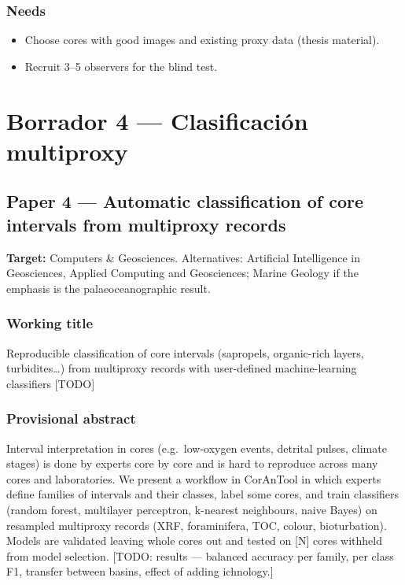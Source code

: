 \documentclass[
  10pt,
]{article}
\providecommand{\tightlist}{%
  \setlength{\itemsep}{0pt}\setlength{\parskip}{0pt}}
\begin{document}
\hypertarget{needs-1}{%
\subsubsection{Needs}\label{needs-1}}

\begin{itemize}
\tightlist
\item[$\square$]
  Choose cores with good images and existing proxy data (thesis
  material).
\item[$\square$]
  Recruit 3--5 observers for the blind test.
\end{itemize}

\newpage

\hypertarget{borrador-4-clasificaciuxf3n-multiproxy}{%
\section{Borrador 4 --- Clasificación
multiproxy}\label{borrador-4-clasificaciuxf3n-multiproxy}}

\hypertarget{paper-4-automatic-classification-of-core-intervals-from-multiproxy-records}{%
\subsection{Paper 4 --- Automatic classification of core intervals from
multiproxy
records}\label{paper-4-automatic-classification-of-core-intervals-from-multiproxy-records}}

\textbf{Target:} Computers \& Geosciences. Alternatives: Artificial
Intelligence in Geosciences, Applied Computing and Geosciences; Marine
Geology if the emphasis is the palaeoceanographic result.

\hypertarget{working-title-2}{%
\subsubsection{Working title}\label{working-title-2}}

Reproducible classification of core intervals (sapropels, organic-rich
layers, turbidites\ldots) from multiproxy records with user-defined
machine-learning classifiers {[}TODO{]}

\hypertarget{provisional-abstract-1}{%
\subsubsection{Provisional abstract}\label{provisional-abstract-1}}

Interval interpretation in cores (e.g.~low-oxygen events, detrital
pulses, climate stages) is done by experts core by core and is hard to
reproduce across many cores and laboratories. We present a workflow in
CorAnTool in which experts define families of intervals and their
classes, label some cores, and train classifiers (random forest,
multilayer perceptron, k-nearest neighbours, naive Bayes) on resampled
multiproxy records (XRF, foraminifera, TOC, colour, bioturbation).
Models are validated leaving whole cores out and tested on {[}N{]} cores
withheld from model selection. {[}TODO: results --- balanced accuracy
per family, per class F1, transfer between basins, effect of adding
ichnology.{]}
\end{document}
